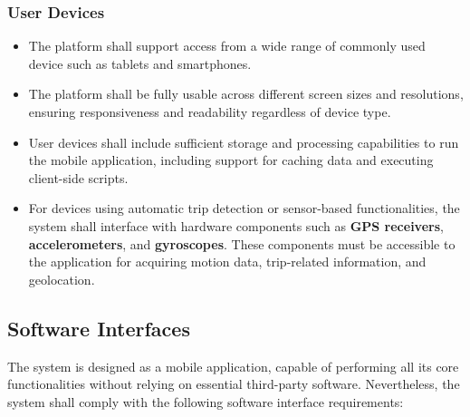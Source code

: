 \subsubsection*{User Devices}
\begin{itemize}
    \item The platform shall support access from a wide range of commonly used device such as tablets and smartphones. %
    
    \item The platform shall be fully usable across different screen sizes and resolutions, ensuring responsiveness and readability regardless of device type.

    \item User devices shall include sufficient storage and processing capabilities to run the mobile application, including support for caching data and executing client-side scripts.

    \item For devices using automatic trip detection or sensor-based functionalities, the system shall interface with hardware components such as \textbf{GPS receivers}, \textbf{accelerometers}, and \textbf{gyroscopes}. These components must be accessible to the application for acquiring motion data, trip-related information, and geolocation.%
    
\end{itemize}


\subsection{Software Interfaces}

The system is designed as a mobile application, capable of performing all its core functionalities without relying on essential third-party software. Nevertheless, the system shall comply with the following software interface requirements:

